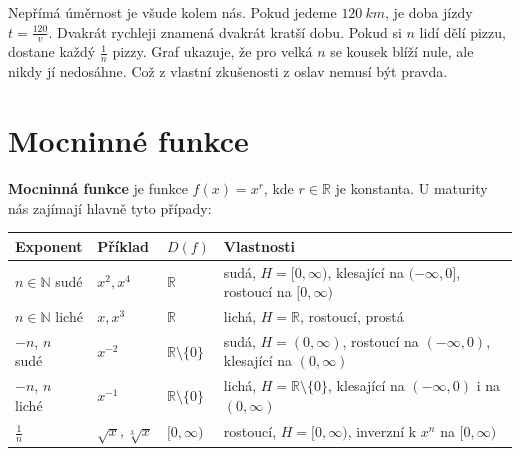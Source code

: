 \begin{example}
  Nepřímá úměrnost je všude kolem nás. Pokud jedeme $120\ \si{km}$, je doba jízdy $t = \frac{120}{v}$. Dvakrát rychleji znamená dvakrát kratší dobu. Pokud si $n$ lidí dělí pizzu, dostane každý $\frac{1}{n}$ pizzy. Graf ukazuje, že pro velká $n$ se kousek blíží nule, ale nikdy jí nedosáhne. Což z vlastní zkušenosti z oslav nemusí být pravda.
\end{example}

\section{Mocninné funkce}\label{sec:mocninne-funkce}

\begin{definitionbox}
  \textbf{Mocninná funkce} je funkce $f(x) = x^r$, kde $r\in\mathbb{R}$ je konstanta. U maturity nás zajímají hlavně tyto případy:
  \begin{center}
    \renewcommand{\arraystretch}{1.4}
    \begin{tabular}{|l|l|l|l|}
      \hline
      Exponent & Příklad & $D(f)$ & Vlastnosti \\
      \hline
      $n\in\mathbb{N}$ sudé & $x^2, x^4$ & $\mathbb{R}$ & sudá, $H = [0, \infty)$, klesající na $(-\infty, 0]$, rostoucí na $[0, \infty)$ \\
      $n\in\mathbb{N}$ liché & $x, x^3$ & $\mathbb{R}$ & lichá, $H = \mathbb{R}$, rostoucí, prostá \\
      $-n$, $n$ sudé & $x^{-2}$ & $\mathbb{R}\setminus\{0\}$ & sudá, $H = (0, \infty)$, rostoucí na $(-\infty, 0)$, klesající na $(0, \infty)$ \\
      $-n$, $n$ liché & $x^{-1}$ & $\mathbb{R}\setminus\{0\}$ & lichá, $H = \mathbb{R}\setminus\{0\}$, klesající na $(-\infty, 0)$ i na $(0, \infty)$ \\
      $\frac{1}{n}$ & $\sqrt{x}, \sqrt[3]{x}$ & $[0, \infty)$ & rostoucí, $H = [0, \infty)$, inverzní k $x^n$ na $[0, \infty)$ \\
      \hline
    \end{tabular}
  \end{center}
\end{definitionbox}

